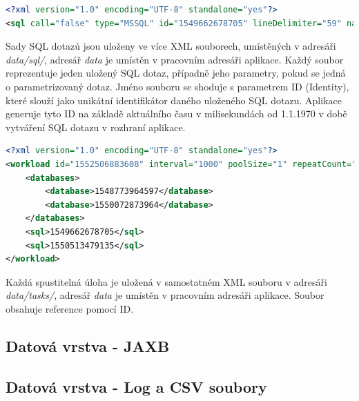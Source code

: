 \documentclass[czech,bachelor,public,dept460,male,cpdeclaration,twoside]{diploma}
\begin{document}
\lstset{aboveskip=30pt}

\begin{minipage}{\linewidth}
\begin{lstlisting}[caption=SQL dotazy s parametry ve formátu XML\label{lst:set},language=XML] 
<?xml version="1.0" encoding="UTF-8" standalone="yes"?>
<sql call="false" type="MSSQL" id="1549662678705" lineDelimiter="59" name="MujSelect" paramDelimiter="44" parametrized="true" query="true" text="select * from test;" timeout="100" update="false"/>
\end{lstlisting}
Sady SQL dotazů jsou uloženy ve více XML souborech, umístěných v adresáři \textit{data/sql/}, adresář \textit{data} je umístěn v pracovním adresáři aplikace. Každý soubor reprezentuje jeden uložený SQL dotaz, případně jeho parametry, pokud se jedná o parametrizovaný dotaz. Jméno souboru se shoduje s parametrem ID (Identity), které slouží jako unikátní identifikátor daného uloženého SQL dotazu. Aplikace generuje tyto ID na základě aktuálního času v milisekundách od 1.1.1970 v době vytváření SQL dotazu v rozhraní aplikace.
\end{minipage}

\lstset{aboveskip=30pt}

\begin{minipage}{\linewidth}
\begin{lstlisting}[caption=Spustitelná úloha ve formátu XML\label{lst:task},language=XML] 
<?xml version="1.0" encoding="UTF-8" standalone="yes"?>
<workload id="1552506883608" interval="1000" poolSize="1" repeatCount="-1" taskName="SuperTest">
    <databases>
        <database>1548773964597</database>
        <database>1550072873964</database>
    </databases>
    <sql>1549662678705</sql>
    <sql>1550513479135</sql>
</workload>
\end{lstlisting}
Každá spustitelná úloha je uložená v samostatném XML souboru v adresáři \textit{data/tasks/}, adresář \textit{data} je umístěn v pracovním adresáři aplikace. Soubor obsahuje reference pomocí ID.
\end{minipage}

\subsection{Datová vrstva - JAXB} \label{jabx}

\subsection{Datová vrstva - Log a CSV soubory} \label{logs}
\end{document}
